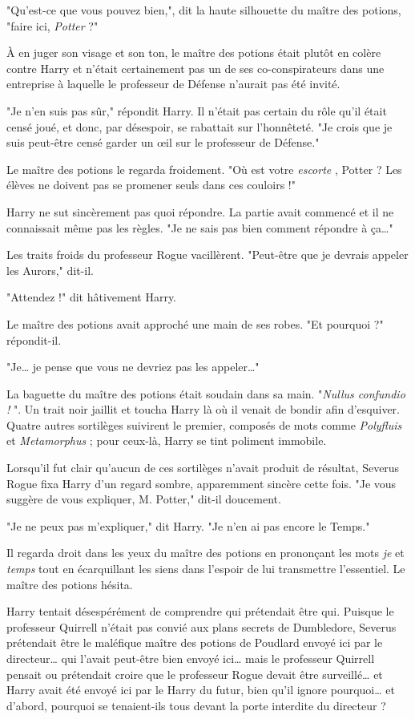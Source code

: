"Qu'est-ce que vous pouvez bien,", dit la haute silhouette du maître des potions, "faire ici, \emph{Potter}  ?"

À en juger son visage et son ton, le maître des potions était plutôt en colère contre Harry et n'était certainement pas un de ses co-conspirateurs dans une entreprise à laquelle le professeur de Défense n'aurait pas été invité.

"Je n'en suis pas sûr," répondit Harry. Il n'était pas certain du rôle qu'il était censé joué, et donc, par désespoir, se rabattait sur l'honnêteté. "Je crois que je suis peut-être censé garder un œil sur le professeur de Défense."

Le maître des potions le regarda froidement. "Où est votre \emph{escorte} , Potter ? Les élèves ne doivent pas se promener seuls dans ces couloirs !"

Harry ne sut sincèrement pas quoi répondre. La partie avait commencé et il ne connaissait même pas les règles. "Je ne sais pas bien comment répondre à ça…"

Les traits froids du professeur Rogue vacillèrent. "Peut-être que je devrais appeler les Aurors," dit-il.

"Attendez !" dit hâtivement Harry.

Le maître des potions avait approché une main de ses robes. "Et pourquoi ?" répondit-il.

"Je… je pense que vous ne devriez pas les appeler…"

La baguette du maître des potions était soudain dans sa main. "\emph{Nullus confundio !} ". Un trait noir jaillit et toucha Harry là où il venait de bondir afin d'esquiver. Quatre autres sortilèges suivirent le premier, composés de mots comme \emph{Polyfluis}  et \emph{Metamorphus}  ; pour ceux-là, Harry se tint poliment immobile.

Lorsqu'il fut clair qu'aucun de ces sortilèges n'avait produit de résultat, Severus Rogue fixa Harry d'un regard sombre, apparemment sincère cette fois. "Je vous suggère de vous expliquer, M. Potter," dit-il doucement.

"Je ne peux pas m'expliquer," dit Harry. "Je n'en ai pas encore le Temps."

Il regarda droit dans les yeux du maître des potions en prononçant les mots \emph{je}  et \emph{temps}  tout en écarquillant les siens dans l'espoir de lui transmettre l'essentiel. Le maître des potions hésita.

Harry tentait désespérément de comprendre qui prétendait être qui. Puisque le professeur Quirrell n'était pas convié aux plans secrets de Dumbledore, Severus prétendait être le maléfique maître des potions de Poudlard envoyé ici par le directeur… qui l'avait peut-être bien envoyé ici… mais le professeur Quirrell pensait ou prétendait croire que le professeur Rogue devait être surveillé… et Harry avait été envoyé ici par le Harry du futur, bien qu'il ignore pourquoi… et d'abord, pourquoi se tenaient-ils tous devant la porte interdite du directeur ?

